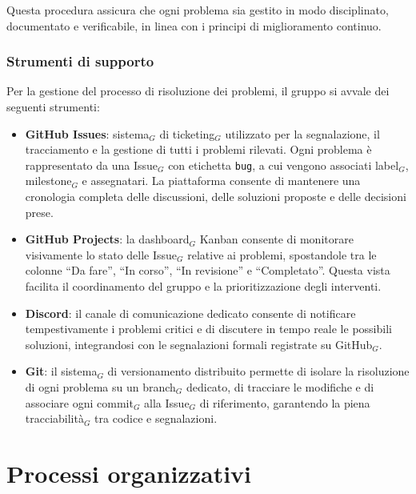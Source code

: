 \documentclass[a4paper, 10pt]{article}
\begin{document}
Questa procedura assicura che ogni problema sia gestito in modo disciplinato, documentato e verificabile, in linea con i principi di miglioramento continuo.

\subsubsection{Strumenti di supporto}
\label{subsubsec:strumenti_risoluzione}

Per la gestione del processo di risoluzione dei problemi, il gruppo si avvale dei seguenti strumenti:

\begin{itemize}
    \item \textbf{GitHub Issues}: sistema$_G$ di ticketing$_G$ utilizzato per la segnalazione, il tracciamento e la gestione di tutti i problemi rilevati. Ogni problema è rappresentato da una Issue$_G$ con etichetta \texttt{bug}, a cui vengono associati label$_G$, milestone$_G$ e assegnatari. La piattaforma consente di mantenere una cronologia completa delle discussioni, delle soluzioni proposte e delle decisioni prese.
    
    \item \textbf{GitHub Projects}: la dashboard$_G$ Kanban consente di monitorare visivamente lo stato delle Issue$_G$ relative ai problemi, spostandole tra le colonne ``Da fare'', ``In corso'', ``In revisione'' e ``Completato''. Questa vista facilita il coordinamento del gruppo e la prioritizzazione degli interventi.
    
    \item \textbf{Discord}: il canale di comunicazione dedicato consente di notificare tempestivamente i problemi critici e di discutere in tempo reale le possibili soluzioni, integrandosi con le segnalazioni formali registrate su GitHub$_G$.
    
    \item \textbf{Git}: il sistema$_G$ di versionamento distribuito permette di isolare la risoluzione di ogni problema su un branch$_G$ dedicato, di tracciare le modifiche e di associare ogni commit$_G$ alla Issue$_G$ di riferimento, garantendo la piena tracciabilità$_G$ tra codice e segnalazioni.
\end{itemize}

\section{Processi organizzativi}
\label{sec:processi_organizzativi}
\end{document}
